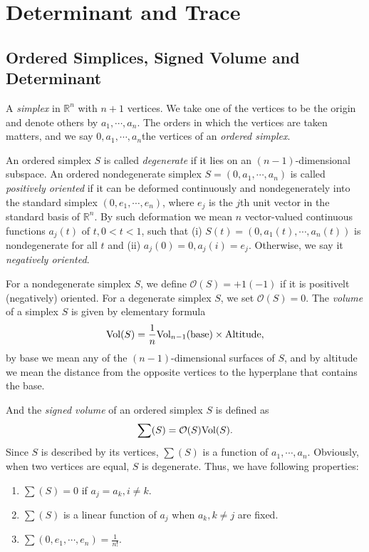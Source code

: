 \documentclass[10pt]{book}
\theoremstyle{definition}
\numberwithin{equation}{chapter}
\begin{document}
\chapter{Determinant and Trace}
\section{Ordered Simplices, Signed Volume and Determinant}
A \emph{simplex} in $\mathbb{R}^n$ with $n+1$ vertices. We take one of the vertices to be the origin and denote others by $a_1,\cdots, a_n$. The orders in which the vertices are taken matters, and we say $0, a_1,\cdots, a_n$the vertices of an \emph{ordered simplex}.

An ordered simplex $S$ is called \emph{degenerate} if it lies on an $(n-1)$-dimensional subspace. An ordered nondegenerate simplex $S = (0, a_1,\cdots, a_n)$ is called \emph{positively oriented} if it can be deformed continuously and nondegenerately into the standard simplex $(0, e_1,\cdots, e_n)$, where $e_j$ is the $j$th unit vector in the standard basis of $\mathbb{R}^n$. By such deformation we mean $n$ vector-valued continuous functions $a_j(t)$ of $t,0 < t < 1$, such that (i) $S(t) = (0,a_1(t),\cdots, a_n(t))$ is nondegenerate for all $t$ and (ii) $a_j(0) = 0, a_j(i) = e_j$. 
Otherwise, we say it \emph{negatively oriented}. 

For a nondegenerate simplex $S$, we define $\mathcal{O}(S) = +1(-1)$ if it is positivelt (negatively) oriented. For a degenerate simplex $S$, we set $\mathcal{O}(S) = 0$. The \emph{volume} of a simplex $S$ is given by elementary formula
\begin{align*}
    {\rm Vol}(S) = \frac{1}{n} {\rm Vol}_{n-1}({\rm base}) \times {\rm Altitude},
\end{align*}
by base we mean any of the $(n-1)$-dimensional surfaces of $S$, and by altitude we mean the distance from the opposite vertices to the hyperplane that contains the base. 

And the \emph{signed volume} of an ordered simplex $S$ is defined as 
\begin{align*}
    \sum (S) = \mathcal{O}(S){\rm Vol}(S).
\end{align*}
Since $S$ is described by its vertices, $\sum (S)$ is a function of $a_1,\cdots,a_n$. Obviously, when two vertices are equal, $S$ is degenerate. Thus, we have following properties:
\begin{enumerate}[label=(\arabic*)]
    \item $\sum (S) = 0$ if $a_j = a_k, i\neq k$.
    \item $\sum (S)$ is a linear function of $a_j$ when $a_k, k\neq j$ are fixed.
    \item $\sum (0,e_1,\cdots,e_n) = \frac{1}{n!}$.
\end{enumerate}
\end{document}
